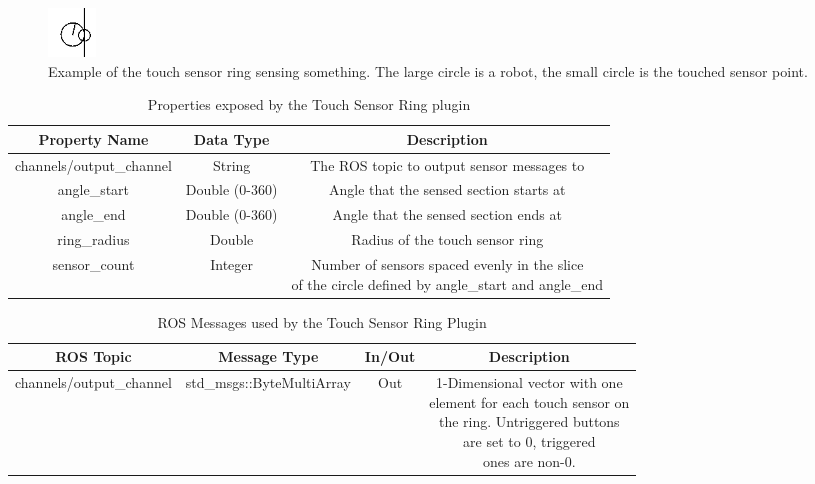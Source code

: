 \begin{itemize}
	\begin{figure}[h]
		\centering
		\includegraphics{./images_design/touch_sensor}
		\caption{Example of the touch sensor ring sensing something. The large circle is a robot, the small circle is the touched sensor point.}
		\label{fig:touchsensorexample}
	\end{figure}
\begin{table}[h!]
	\centering
	\caption{Properties exposed by the Touch Sensor Ring plugin}
	\label{tab:touch_ring_props}
	\begin{tabular}{c|c|c}
	Property Name & Data Type & Description\\ \hline \hline
	channels/output\_channel & String & The ROS topic to output sensor messages to\\ \hline
	angle\_start & Double (0-360) & Angle that the sensed section starts at\\ \hline
	angle\_end & Double (0-360) & Angle that the sensed section ends at\\ \hline
	ring\_radius & Double & Radius of the touch sensor ring\\ \hline
	sensor\_count & Integer & \makecell{Number of sensors spaced evenly in the slice\\ of the circle defined by angle\_start and angle\_end}
	\end{tabular}
\end{table}
\begin{table}[h!]
	\centering
	\caption{ROS Messages used by the Touch Sensor Ring Plugin}
	\label{tab:touch_ring_msgs}
	\begin{tabular}{c|c|c|c}
	ROS Topic & Message Type & In/Out & Description\\ \hline \hline
	channels/output\_channel & std\_msgs::ByteMultiArray & Out & \makecell{1-Dimensional vector with one\\ element for each touch sensor on\\ the ring. Untriggered buttons\\ are set to 0, triggered\\ ones are non-0.}
	\end{tabular}
\end{table}

\end{itemize}
